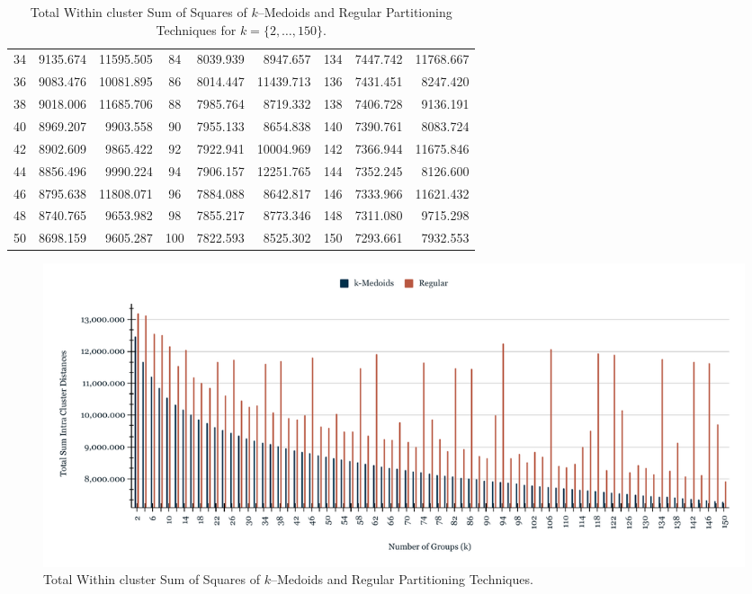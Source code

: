 \begin{table}[h]
\begin{tabular}{|c|r|r|c|r|r|c|r|r|}
		34 &  9135.674 & 11595.505 &  84 & 8039.939 &  8947.657 & 134 & 7447.742 & 11768.667 \\
		36 &  9083.476 & 10081.895 &  86 & 8014.447 & 11439.713 & 136 & 7431.451 &  8247.420 \\
		38 &  9018.006 & 11685.706 &  88 & 7985.764 &  8719.332 & 138 & 7406.728 &  9136.191 \\
		40 &  8969.207 &  9903.558 &  90 & 7955.133 &  8654.838 & 140 & 7390.761 &  8083.724 \\
		42 &  8902.609 &  9865.422 &  92 & 7922.941 & 10004.969 & 142 & 7366.944 & 11675.846 \\
		44 &  8856.496 &  9990.224 &  94 & 7906.157 & 12251.765 & 144 & 7352.245 &  8126.600 \\
		46 &  8795.638 & 11808.071 &  96 & 7884.088 &  8642.817 & 146 & 7333.966 & 11621.432 \\
		48 &  8740.765 &  9653.982 &  98 & 7855.217 &  8773.346 & 148 & 7311.080 &  9715.298 \\
		50 &  8698.159 &  9605.287 & 100 & 7822.593 &  8525.302 & 150 & 7293.661 &  7932.553 \\ \hline
		
	\end{tabular}
	\caption{Total Within cluster Sum of Squares of $k$--Medoids and Regular Partitioning Techniques for $k = \{2, \ldots, 150\}$.}
	\label{Table:TotalSumRegularkMedoids}
\end{table}


\begin{figure}[h]
	\centering
	\includegraphics[scale=0.46]{../Figures/Scaled-TotalSum-RegularKmedoids}
	\caption{Total Within cluster Sum of Squares of $k$--Medoids and Regular Partitioning Techniques.}
	\label{Fig:TotalSum-RegularKmedoids}
\end{figure}

